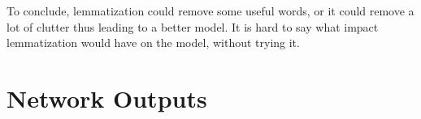 \documentclass{article}
\begin{document}
    To conclude, lemmatization could remove some useful words, or it could remove a lot of clutter thus leading to a better model. It is hard to say what impact lemmatization would have on the model, without trying it.\\

    \section{Network Outputs}
    \begin{figure}[h!]
        \centering
        \begin{subfigure}[t]{0.45\textwidth}
            \centering
            \caption{}
        \end{subfigure}
        \begin{subfigure}[t]{0.45\textwidth}
            \centering
            \caption{}
        \end{subfigure}
        \begin{subfigure}[t]{0.45\textwidth}
            \centering
            \caption{}
        \end{subfigure}
        \begin{subfigure}[t]{0.45\textwidth}
            \centering
            \caption{}
        \end{subfigure}
        \caption{}
    \end{figure}
    \newpage
    \begin{figure}[h!]
        \centering
        \begin{subfigure}[t]{0.45\textwidth}
            \centering
            \caption{}
        \end{subfigure}
        \begin{subfigure}[t]{0.45\textwidth}
            \centering
            \caption{}
        \end{subfigure}
        \begin{subfigure}[t]{0.45\textwidth}
            \centering
            \caption{}
        \end{subfigure}
        \begin{subfigure}[t]{0.45\textwidth}
            \centering
            \caption{}
        \end{subfigure}
        \caption{}
    \end{figure}
\end{document}
